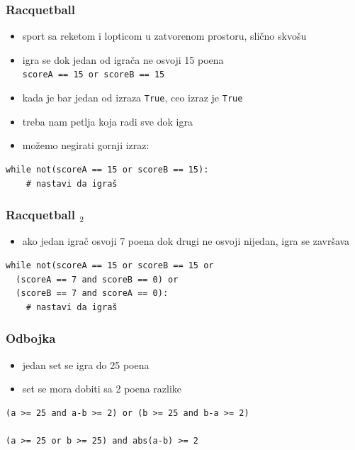 \documentclass[utf8,compress]{beamer}
\begin{document}
\begin{frame}[fragile]
  \frametitle{Racquetball}
  \begin{itemize}
    \item sport sa reketom i lopticom u zatvorenom prostoru, slično skvošu
    \item igra se dok jedan od igrača ne osvoji 15 poena \\
      \texttt{scoreA == 15 or scoreB == 15}
    \item kada je bar jedan od izraza \texttt{True}, ceo izraz je \texttt{True}
    \item treba nam petlja koja radi sve dok igra 
    \item možemo negirati gornji izraz:
  \end{itemize}
\begin{verbatim}
while not(scoreA == 15 or scoreB == 15):
    # nastavi da igraš
\end{verbatim}
\end{frame}

\begin{frame}[fragile]
  \frametitle{Racquetball $_2$}
  \begin{itemize}
    \item ako jedan igrač osvoji 7 poena dok drugi ne osvoji nijedan, igra se završava
  \end{itemize}
\begin{verbatim}
while not(scoreA == 15 or scoreB == 15 or 
  (scoreA == 7 and scoreB == 0) or 
  (scoreB == 7 and scoreA == 0):
    # nastavi da igraš
\end{verbatim}
\end{frame}

\begin{frame}[fragile]
  \frametitle{Odbojka}
  \begin{itemize}
    \item jedan set se igra do 25 poena
    \item set se mora dobiti sa 2 poena razlike
  \end{itemize}
\begin{verbatim}
(a >= 25 and a-b >= 2) or (b >= 25 and b-a >= 2)

(a >= 25 or b >= 25) and abs(a-b) >= 2
\end{verbatim}
\end{frame}
\end{document}
